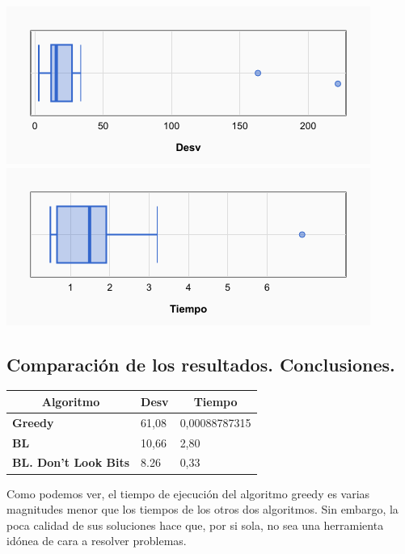 \documentclass[a4paper, 12pt]{article}
\begin{document}
	\begin{center}
         \includegraphics[scale=0.5]{desv-ilsEsProp}
         \includegraphics[scale=0.5]{time-ilsEsProp}
      \end{center}
      
      
      
      
      \newpage
      \subsection{Comparación de los resultados. Conclusiones.}
\begin{table}[H]
\centering
\label{my-label}
\begin{tabular}{|l|l|l|}
\hline
\multicolumn{1}{|c|}{\textbf{Algoritmo}} & \textbf{Desv} & \multicolumn{1}{c|}{\textbf{Tiempo}} \\ \hline
\textbf{Greedy}                          & 61,08         & 0,00088787315                        \\ \hline
\textbf{BL}                              & 10,66         & 2,80                                 \\ \hline
\textbf{BL. Don't Look Bits}             & 8.26          & 0,33                                 \\ \hline
\end{tabular}
\end{table}
      
      Como podemos ver, el tiempo de ejecución del algoritmo greedy es varias magnitudes menor que los tiempos de los otros dos algoritmos. Sin embargo, la poca calidad de sus soluciones hace que, por si sola, no sea una herramienta idónea de cara a resolver problemas.\\
      
\end{document}
